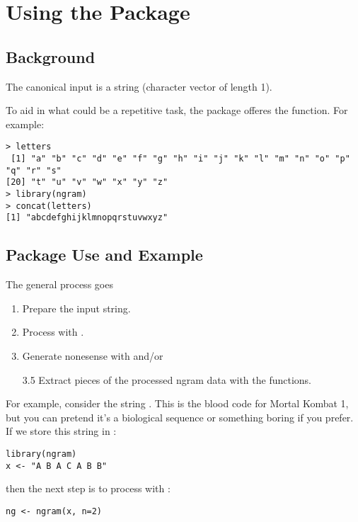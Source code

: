 \section{Using the Package}


\subsection{Background}

The canonical input is a string (character vector of length 1).  

To aid in what could be a repetitive task, the package offeres 
the  function.  For example:

\begin{lstlisting}[language=rr]
> letters
 [1] "a" "b" "c" "d" "e" "f" "g" "h" "i" "j" "k" "l" "m" "n" "o" "p" "q" "r" "s"
[20] "t" "u" "v" "w" "x" "y" "z"
> library(ngram)
> concat(letters)
[1] "abcdefghijklmnopqrstuvwxyz"
\end{lstlisting}



\subsection{Package Use and Example}

The general process goes
\begin{enumerate}
  \item Prepare the input string.
  \item Process with .
  \item Generate nonesense with  and/or
  \item[3.5] Extract pieces of the processed ngram data with the  
functions.
\end{enumerate}



For example, consider the string . This is the blood code 
for Mortal Kombat 1, but you can pretend it's a biological sequence or 
something boring if you prefer.  If we store this string in :

\begin{lstlisting}[language=rr]
library(ngram)
x <- "A B A C A B B"
\end{lstlisting}

then the next step is to process with :

\begin{lstlisting}[language=rr]
ng <- ngram(x, n=2)
\end{lstlisting}

